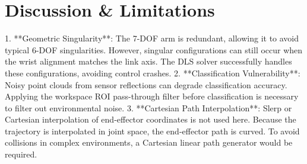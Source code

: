 \documentclass[12pt, a4paper]{article}
\begin{document}
\section{Discussion \& Limitations}
1. **Geometric Singularity**: The 7-DOF arm is redundant, allowing it to avoid typical 6-DOF singularities. However, singular configurations can still occur when the wrist alignment matches the link axis. The DLS solver successfully handles these configurations, avoiding control crashes.
2. **Classification Vulnerability**: Noisy point clouds from sensor reflections can degrade classification accuracy. Applying the workspace ROI pass-through filter before classification is necessary to filter out environmental noise.
3. **Cartesian Path Interpolation**: Slerp or Cartesian interpolation of end-effector coordinates is not used here. Because the trajectory is interpolated in joint space, the end-effector path is curved. To avoid collisions in complex environments, a Cartesian linear path generator would be required.
\end{document}
